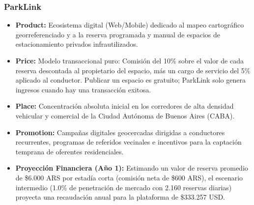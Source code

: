 \subsubsection{ParkLink}
\begin{itemize}
    \item \textbf{Product:} Ecosistema digital (Web/Mobile) dedicado al mapeo cartográfico georreferenciado y a la reserva programada y manual de espacios de estacionamiento privados infrautilizados.
    \item \textbf{Price:} Modelo transaccional puro: Comisión del 10\% sobre el valor de cada reserva descontada al propietario del espacio, más un cargo de servicio del 5\% aplicado al conductor. Publicar un espacio es gratuito; ParkLink solo genera ingresos cuando hay una transacción exitosa.
    \item \textbf{Place:} Concentración absoluta inicial en los corredores de alta densidad vehicular y comercial de la Ciudad Autónoma de Buenos Aires (CABA).
    \item \textbf{Promotion:} Campañas digitales geocercadas dirigidas a conductores recurrentes, programas de referidos vecinales e incentivos para la captación temprana de oferentes residenciales.
    \item \textbf{Proyección Financiera (Año 1):} Estimando un valor de reserva promedio de \$6.000 ARS por estadía corta (comisión neta de \$600 ARS), el escenario intermedio (1.0\% de penetración de mercado con 2.160 reservas diarias) proyecta una recaudación anual para la plataforma de \$333.257 USD.
\end{itemize}

\vspace{0.5cm}
\begin{table}[H]
\centering
\renewcommand{\arraystretch}{2.2}
{\small
{}
}
\caption{Viabilidad comparativa de las 4Ps por propuesta}
\label{tab:4ps}
\end{table}


